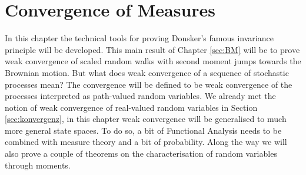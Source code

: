 \chapter{Convergence of Measures}\label{chapter:CV}
	\marginpar{\textcolor{red}{Lecture 11}}
In this chapter the technical tools for proving Donsker's famous invariance principle will be developed. This main result of Chapter \ref{sec:BM} will be to prove weak convergence of scaled random walks with second moment jumps towards the Brownian motion. But what does weak convergence of a sequence of stochastic processes mean? The convergence will be defined to be weak convergence of the processes interpreted as path-valued random variables. We already met the notion of weak convergence of real-valued random variables in Section \ref{sec:konvergenz}, in this chapter weak convergence will be generalised to much more general state spaces. To do so, a bit of Functional Analysis needs to be combined with measure theory and a bit of probability. Along the way we will also prove a couple of theorems on the characterisation of random variables through moments. 


